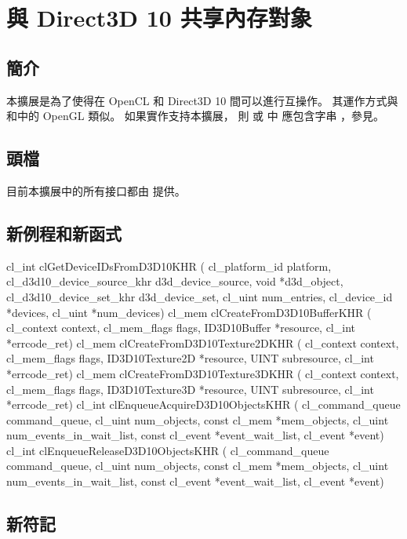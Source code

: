 \section{與 Direct3D 10 共享內存對象}

\subsection{簡介}

本擴展是為了使得在 OpenCL 和 Direct3D 10 間可以進行互操作。
其運作方式與和中的 OpenGL 類似。
如果實作支持本擴展，
則  或  中
應包含字串 ，參見。

\subsection{頭檔}

目前本擴展中的所有接口都由  提供。

\subsection{新例程和新函式}

\startCLFUNC
cl_int clGetDeviceIDsFromD3D10KHR (
		cl_platform_id platform,
		cl_d3d10_device_source_khr d3d_device_source,
		void *d3d_object,
		cl_d3d10_device_set_khr d3d_device_set,
		cl_uint num_entries,
		cl_device_id *devices,
		cl_uint *num_devices)
cl_mem clCreateFromD3D10BufferKHR (
		cl_context context,
		cl_mem_flags flags,
		ID3D10Buffer *resource,
		cl_int *errcode_ret)
cl_mem clCreateFromD3D10Texture2DKHR (
		cl_context context,
		cl_mem_flags flags,
		ID3D10Texture2D *resource,
		UINT subresource,
		cl_int *errcode_ret)
cl_mem clCreateFromD3D10Texture3DKHR (
		cl_context context,
		cl_mem_flags flags,
		ID3D10Texture3D *resource,
		UINT subresource,
		cl_int *errcode_ret)
cl_int clEnqueueAcquireD3D10ObjectsKHR (
		cl_command_queue command_queue,
		cl_uint num_objects,
		const cl_mem *mem_objects,
		cl_uint num_events_in_wait_list,
		const cl_event *event_wait_list,
		cl_event *event)
cl_int clEnqueueReleaseD3D10ObjectsKHR (
		cl_command_queue command_queue,
		cl_uint num_objects,
		const cl_mem *mem_objects,
		cl_uint num_events_in_wait_list,
		const cl_event *event_wait_list,
		cl_event *event)
\stopCLFUNC

\subsection{新符記}

